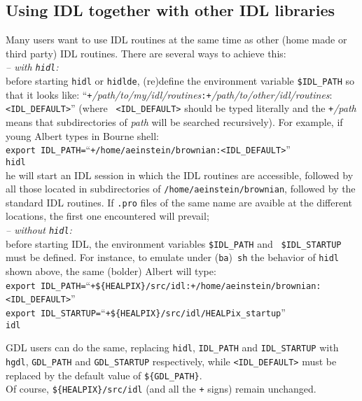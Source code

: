 \documentclass[12pt,twoside]{article}
\makeatletter
\newcommand{\nop}[1]{\Hy@raisedlink{\hypertarget{#1}{}}}
\newcommand{\mytarget}[1]{%
\nop{#1}%
\phantomsection\label{#1}%
}%
\newcommand{\mytarget}[1]{\label{#1}}
\makeatother
\begin{document}
\subsection{Using \healpix IDL together with other IDL libraries}
\label{idl:other_idl_libs}
\mytarget{idl:other_idl_libs}
Many users want to use \healpix IDL routines at the same time as other (home made
or third party) IDL routines. There are several ways to achieve this:\\
%
{\em -- with {\tt hidl}:}\\
before starting {\tt hidl} or {\tt hidlde}, (re)define the environment variable {\tt \$IDL\_PATH} so that it looks like:
``{\tt +}{\it /path/to/my/idl/routines}{\tt :+}{\it /path/to/other/idl/routines}:{\tt
<IDL\_DEFAULT>}''
(where {\tt
<IDL\_DEFAULT>} should be typed literally and the {\tt +}{\it /path} means that
subdirectories of {\em path} will be searched recursively). For example, if
young Albert types in Bourne shell:\\
{\tt export IDL\_PATH=}``{\tt +/home/aeinstein/brownian:<IDL\_DEFAULT>}''\\
{\tt hidl}\\
he will start an IDL session in which the \healpix IDL routines are accessible, followed by all those located
in subdirectories of {\tt /home/aeinstein/brownian}, followed by the standard
IDL routines. If {\tt .pro} files of the same name are avaible at the different locations, the first
one encountered will prevail;\\
%
{\em -- without {\tt hidl}:}\\
before starting IDL, the environment variables {\tt \$IDL\_PATH} and {\tt
\$IDL\_STARTUP} must be defined. For instance, to emulate under ({\tt ba}){\tt
sh} the behavior of {\tt hidl} shown above, the same (bolder) Albert will type:\\
{\tt export IDL\_PATH=}``{\tt +\$\{HEALPIX\}/src/idl:+/home/aeinstein/brownian:<IDL\_DEFAULT>}''\\
{\tt export IDL\_STARTUP=}``{\tt +\$\{HEALPIX\}/src/idl/HEALPix\_startup}''\\
{\tt idl}

GDL users can do the same, replacing {\tt hidl}, {\tt IDL\_PATH} and {\tt IDL\_STARTUP} 
with {\tt hgdl}, {\tt GDL\_PATH} and {\tt GDL\_STARTUP} respectively, 
while {\tt <IDL\_DEFAULT>} must be replaced by the default value of {\tt \$\{GDL\_PATH\}}.\\
Of course, {\tt \$\{HEALPIX\}/src/idl} (and all the {\tt +} signs) remain unchanged.
\end{document}
